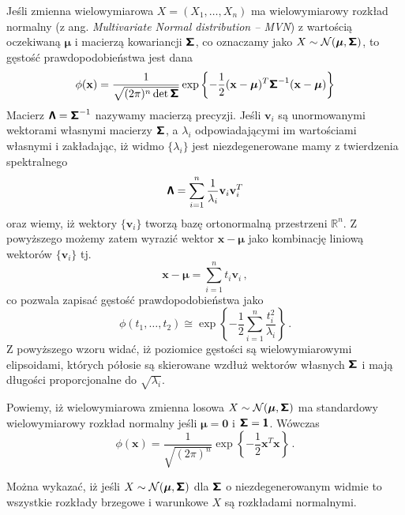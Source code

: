 \documentclass{myclass}
\begin{document}
Jeśli zmienna wielowymiarowa \(X = (X_1, \ldots, X_n)\) ma wielowymiarowy rozkład normalny (z ang.
\textit{Multivariate Normal distribution -- MVN}) z wartością oczekiwaną \(\boldsymbol{\mu}\) i
macierzą kowariancji \(\boldsymbol{\mathsf{\Sigma}}\), co oznaczamy jako \(X \sim \mathcal{N}(\boldsymbol{\mu},
\boldsymbol{\mathsf{\Sigma}})\), to gęstość prawdopodobieństwa jest dana
\begin{equation*}
    \phi(\mathbf{x}) = \frac{1}{\sqrt{(2\pi)^n\det\boldsymbol{\mathsf{\Sigma}}}}\exp\left\{-\frac{1}{2}(\mathbf{x} - \boldsymbol{\mu})^T\boldsymbol{\mathsf{\Sigma}}^{-1}(\mathbf{x} - \boldsymbol{\mu})\right\}
\end{equation*}
Macierz \(\boldsymbol{\mathsf{\Lambda}} = \boldsymbol{\mathsf{\Sigma}}^{-1}\) nazywamy macierzą precyzji. Jeśli \(\mathbf{v}_i\)
są unormowanymi wektorami własnymi macierzy \(\boldsymbol{\mathsf{\Sigma}}\), a \(\lambda_i\) odpowiadającymi im
wartościami własnymi i zakładając, iż widmo \(\{\lambda_i\}\) jest niezdegenerowane mamy z
twierdzenia spektralnego
\begin{equation*}
    \boldsymbol{\mathsf{\Lambda}} = \sum_{i=1}^n\frac{1}{\lambda_i}\mathbf{v}_i\mathbf{v}_i^T
\end{equation*}
oraz wiemy, iż wektory \(\{\mathbf{v}_i\}\) tworzą bazę ortonormalną przestrzeni \(\mathbb{R}^n\). Z
powyższego możemy zatem wyrazić wektor \(\mathbf{x} - \boldsymbol{\mu}\) jako kombinację liniową
wektorów \(\{\mathbf{v}_i\}\) tj.
\begin{equation*}
    \mathbf{x} - \boldsymbol{\mu} = \sum_{i=1}^n t_i\mathbf{v}_i\,,
\end{equation*}
co pozwala zapisać gęstość prawdopodobieństwa jako
\begin{equation*}
    \phi(t_1,\ldots,t_2) \cong \exp\left\{-\frac{1}{2}\sum_{i=1}^n\frac{t_i^2}{\lambda_i}\right\}\,.
\end{equation*}
Z powyższego wzoru widać, iż poziomice gęstości są wielowymiarowymi elipsoidami, których półosie są
skierowane wzdłuż wektorów własnych \(\boldsymbol{\mathsf{\Sigma}}\) i mają długości proporcjonalne do
\(\sqrt{\lambda_i}\).

Powiemy, iż wielowymiarowa zmienna losowa \(X \sim \mathcal{N}(\boldsymbol{\mu}, \boldsymbol{\mathsf{\Sigma}})\) ma
standardowy wielowymiarowy rozkład normalny jeśli \(\boldsymbol{\mu} = \mathbf{0}\) i
\(\boldsymbol{\mathsf{\Sigma}} = \boldsymbol{\mathsf{1}}\). Wówczas
\begin{equation*}
    \phi(\mathbf{x}) = \frac{1}{\sqrt{(2\pi)^n}}\exp\left\{-\frac{1}{2}\mathbf{x}^T\mathbf{x}\right\}\,.
\end{equation*}

Można wykazać, iż jeśli \(X \sim \mathcal{N}(\boldsymbol{\mu}, \boldsymbol{\mathsf{\Sigma}})\) dla
\(\boldsymbol{\mathsf{\Sigma}}\) o niezdegenerowanym widmie to wszystkie rozkłady brzegowe i warunkowe \(X\) są
rozkładami normalnymi.
\end{document}
